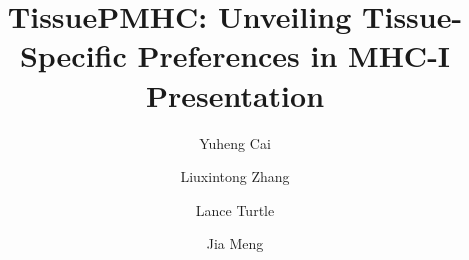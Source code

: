 \documentclass[webpdf,modern,large,nocrop,noinfo]{oup-authoring-template}
\title[TissuePMHC]{TissuePMHC: Unveiling Tissue-Specific Preferences in MHC-I Presentation}
\author[1,2,3,\textdagger]{Yuheng Cai}
\author[1,\textdagger]{Liuxintong Zhang}
\author[2]{Lance Turtle}
\author[1,*]{Jia Meng}
\begin{document}
\maketitle












\balance

\end{document}
